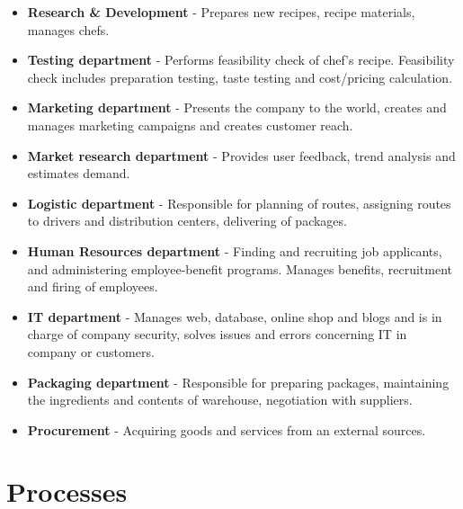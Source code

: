 \documentclass[11pt,a4paper]{article}
\begin{document}
\begin{itemize}
    \item \textbf{Research \& Development} - Prepares new recipes, recipe materials, manages chefs.
    \item \textbf{Testing department} - Performs feasibility check of chef’s recipe. Feasibility check includes preparation testing, taste testing and cost/pricing calculation.
    \item \textbf{Marketing department} - Presents the company to the world, creates and manages marketing campaigns and creates customer reach.
    \item \textbf{Market research department} - Provides user feedback, trend analysis and estimates demand.
    \item \textbf{Logistic department} - Responsible for planning of routes, assigning routes to drivers and distribution centers, delivering of packages.
    \item \textbf{Human Resources department} - Finding and recruiting job applicants, and administering employee-benefit programs. Manages benefits, recruitment and firing of employees.
    \item \textbf{IT department} - Manages web, database, online shop and blogs and is in charge of company security, solves issues and errors concerning IT in company or customers.
    \item \textbf{Packaging department} - Responsible for preparing packages, maintaining the ingredients and contents of warehouse, negotiation with suppliers.
    \item \textbf{Procurement} - Acquiring goods and services from an external sources.
\end{itemize}


\section{Processes}
\end{document}
